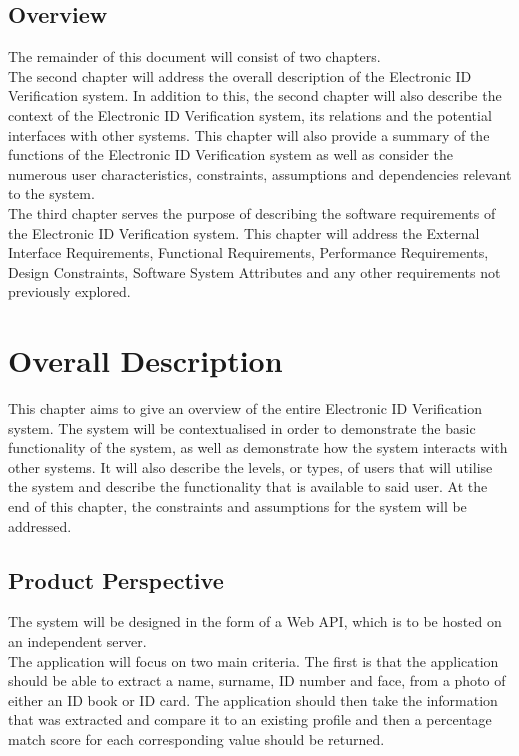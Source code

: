 \documentclass{article}
\def \project{Electronic ID Verification }
\begin{document}
		\subsection{Overview}\label{subsec:overview}
			The remainder of this document will consist of two chapters.\\

            \noindent The second chapter will address the overall description of the \project system. In addition to this, the second chapter will also describe the context of the \project system, its relations and the potential interfaces with other systems. This chapter will also provide a summary of the functions of the \project system as well as consider the numerous user characteristics, constraints, assumptions and dependencies relevant to the system.\\
            
            \noindent The third chapter serves the purpose of describing the software requirements of the \project system. This chapter will address the External Interface Requirements, Functional Requirements, Performance Requirements, Design Constraints, Software System Attributes and any other requirements not previously explored.\\

	\cleardoublepage

	\section{Overall Description}\label{sec:overall-description}
		This chapter aims to give an overview of the entire \project system. The system will be contextualised in order to demonstrate the basic functionality of the system, as well as demonstrate how the system interacts with other systems. It will also describe the levels, or types, of users that will utilise the system and describe the functionality that is available to said user. At the end of this chapter, the constraints and assumptions for the system will be addressed.

		\subsection{Product Perspective}\label{subsec:overall-product-perspective}
		The system will be designed in the form of a Web API, which is to be hosted on an independent server.\\
		
		 \noindent The application will focus on two main criteria. The first is that the application should be able to extract a name, surname, ID number and face, from a photo of either an ID book or ID card. The application should then take the information that was extracted and compare it to an existing profile and then a percentage match score for each corresponding value should be returned.\\
		 
\end{document}
